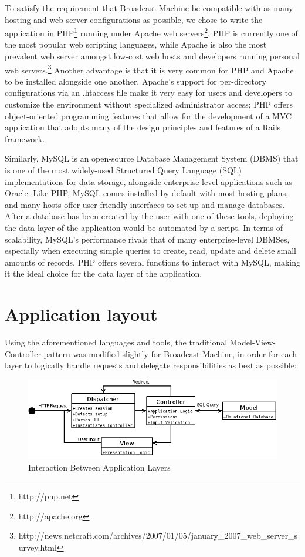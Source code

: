 \documentclass[a4paper,12pt]{report}
\begin{document}
To satisfy the requirement that Broadcast Machine be compatible with as many hosting and web server configurations as possible, we chose to write the application in PHP\footnote{http://php.net} running under Apache web servers\footnote{http://apache.org}. PHP is currently one of the most popular web scripting languages, while Apache is also the most prevalent web server amongst low-cost web hosts and developers running personal web servers.\footnote{http://news.netcraft.com/archives/2007/01/05/january\_2007\_web\_server\_survey.html}
Another advantage is that it is very common for PHP and Apache to be installed alongside one another. Apache's support for per-directory configurations via an .htaccess file make it very easy for users and developers to customize the environment without specialized administrator access; PHP offers object-oriented programming features that allow for the development of a MVC application that adopts many of the design principles and features of a Rails framework.

Similarly, MySQL is an open-source Database Management System (DBMS) that is one of the most widely-used Structured Query Language (SQL) implementations for data storage, alongside enterprise-level applications such as Oracle. Like PHP, MySQL comes installed by default with most hosting plans, and many hosts offer user-friendly interfaces to set up and manage databases. After a database has been created by the user with one of these tools, deploying the data layer of the application would be automated by a script. In terms of scalability, MySQL's performance rivals that of many enterprise-level DBMSes, especially when executing simple queries to create, read, update and delete small amounts of records. PHP offers several functions to interact with MySQL, making it the ideal choice for the data layer of the application.

\section{Application layout}
Using the aforementioned languages and tools, the traditional Model-View-Controller pattern was modified slightly for Broadcast Machine, in order for each layer to logically handle requests and delegate responsibilities as best as possible:

\begin{figure}[h]
\begin{center}
\includegraphics[scale=0.5]{./images/flow.png}
\end{center}
\caption{Interaction Between Application Layers}
\end{figure}
\end{document}
